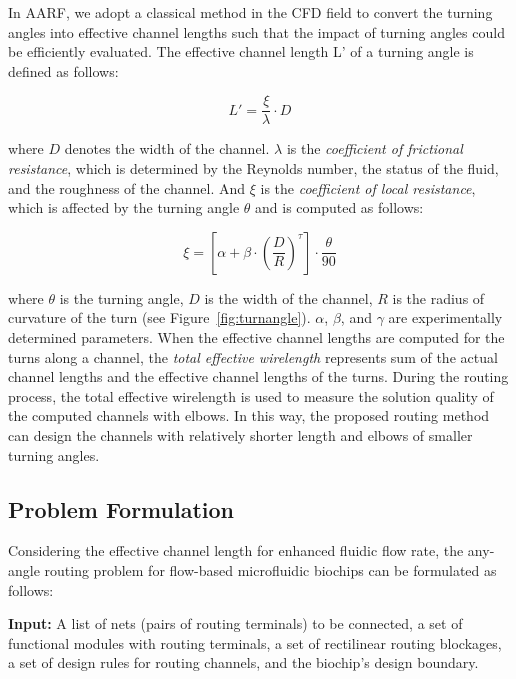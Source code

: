 \documentclass[journal]{IEEEtran}
\begin{document}
In AARF, we adopt a classical method in the CFD field to convert the turning angles 
into effective channel lengths such that the impact of turning angles could be efficiently evaluated. 
The effective channel length L' of a turning angle is defined as follows:

\begin{equation}
\label{eqn:effl}
L' = \frac{\xi}{\lambda} \cdot D
\end{equation}

\noindent where $D$ denotes the width of the channel. $\lambda$ is the 
{\em coefficient of frictional resistance}, which is determined by the Reynolds number, the status of the fluid, and the roughness of the channel. 
And $\xi$ is the {\em coefficient of local resistance}, which is affected by the turning angle $\theta$ and is computed as follows:

\begin{equation}
\xi = [\alpha+\beta \cdot (\frac{D}{R})^{\tau}] \cdot \frac{\theta}{90}
\end{equation}

\noindent where $\theta$ is the turning angle, $D$ is the width of the channel, $R$ is the radius of curvature of the turn (see Figure~\ref{fig:turnangle}). $\alpha$, $\beta$, and $\gamma$ are experimentally determined parameters.
When the effective channel lengths are computed for the turns along a channel, 
the {\em total effective wirelength} represents sum of the actual channel lengths 
and the effective channel lengths of the turns. 
During the routing process, the total effective wirelength is used to measure the 
solution quality of the computed channels with elbows. In this way, the proposed routing 
method can design the channels with relatively shorter length and elbows of smaller turning angles. 

\subsection{Problem Formulation}
\label{subsec:for}

Considering the effective channel length for enhanced fluidic flow rate, the any-angle routing problem for flow-based microfluidic biochips can be formulated as follows:

\textbf{Input:}
A list of nets (pairs of routing terminals) to be connected, a set of functional modules with routing terminals, a set of rectilinear routing blockages, a set of design rules for routing channels, and the biochip's design boundary.
\end{document}
